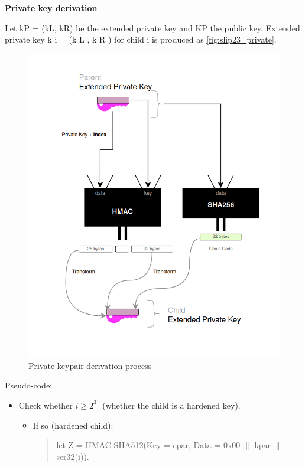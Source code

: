 \begin{adjustwidth}{0.5cm}{}
    \bigskip
    {\textbf{Private key derivation}}

    Let kP = (kL, kR) be the extended private key and KP the public key. Extended private key k i = (k L , k R ) for child i is produced as \autoref{fig:slip23_private}.
    \begin{figure}[ht!]
        \centering
        \includegraphics[width=1\textwidth]{images/slip23_private.png}
        \caption[Private keypair derivation process]{Private keypair derivation process}
        \label{fig:slip23_private}
    \end{figure}

    Pseudo-code:
    \begin{itemize}
        \item Check whether $i \geq 2^{31}$ (whether the child is a hardened key).
              \begin{itemize}
                  \item If so (hardened child):
                        \begin{quote}
                            let Z = HMAC-SHA512(Key = cpar, Data = 0x00 $\parallel$ kpar $\parallel$ ser32(i)).


\end{quote}
\end{itemize}
\end{itemize}
\end{adjustwidth}
